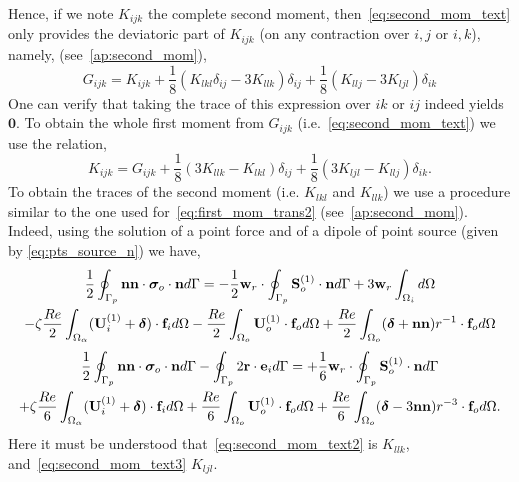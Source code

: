 Hence, if we note $K_{ijk}$ the complete second moment, then~\ref{eq:second_mom_text} only provides the deviatoric part of $K_{ijk}$ (on any contraction over $i,j$ or $i,k$), 
namely, (see~\ref{ap:second_mom}),   
\begin{equation}
    G_{ijk} = K_{ijk}
    +  \frac{1}{8} (K_{lkl}\delta_{ij}  - 3K_{llk})\delta_{ij}  
    + \frac{1}{8} (K_{llj} -3  K_{ljl})\delta_{ik} 
    \label{eq:def_G}
\end{equation}
One can verify that taking the trace of this expression over $ik$ or $ij$ indeed yields $\bm{0}$. 
To obtain the whole first moment from $G_{ijk}$ (i.e.~\ref{eq:second_mom_text}) we use the relation, 
\begin{equation}
    K_{ijk} = G_{ijk}  + \frac{1}{8}(3K_{llk}-K_{lkl}) \delta_{ij} + \frac{1}{8}(3K_{ljl} - K_{llj}) \delta_{ik}. 
    \label{eq:def_K}
\end{equation}
To obtain the traces of the second moment (i.e. $K_{lkl}$ and $K_{llk}$) we use a procedure similar to the one used for~\ref{eq:first_mom_trans2} (see~\ref{ap:second_mom}). 
Indeed, using the solution of a point force and of a dipole of point source (given by \eqref{eq:pts_source_n}) we have, 
 \begin{multline}
    \frac{1}{2}\intS[p]{\textbf{nn} \cdot  \bm\sigma_{o}\cdot \textbf{n}}
    =
    - \frac{1}{2}
    \textbf{w}_{r}\cdot  \intS[p]{\textbf{S}_{o}^{(1)}\cdot \textbf{n}}
    + 3\textbf{w}_r \intO[i]{}\\
    - \zeta \frac{Re}{2} \intO{(\textbf{U}_{i}^{(1)} + \bm\delta)\cdot \textbf{f}_{i}} 
    - \frac{Re}{2}\intO[o]{\textbf{U}_{o}^{(1)}\cdot \textbf{f}_{o}}
    + \frac{Re}{2}\intO[o]{(\bm\delta + \textbf{nn})r^{-1}\cdot \textbf{f}_{o}}
    \label{eq:second_mom_text2}
\end{multline}
\begin{multline}
    \frac{1}{2}\intS[p]{\textbf{nn} \cdot  \bm\sigma_{o}\cdot \textbf{n}}
    - \intS[p]{2 \textbf{r}\cdot \textbf{e}_i}
    =
    +\frac{1}{6}
    \textbf{w}_{r}\cdot  \intS[p]{\textbf{S}_{o}^{(1)}\cdot \textbf{n}}\\
    + \zeta \frac{Re}{6} \intO{(\textbf{U}_{i}^{(1)} + \bm\delta)\cdot \textbf{f}_{i}} 
    + \frac{Re}{6}\intO[o]{\textbf{U}_{o}^{(1)}\cdot \textbf{f}_{o}}
    + 
    \frac{Re}{6}\intO[o]{(\bm\delta - 3\textbf{nn})r^{-3}\cdot \textbf{f}_{o}}.
    \label{eq:second_mom_text3}
\end{multline}
Here it must be understood that~\ref{eq:second_mom_text2} is $K_{llk}$, and~\ref{eq:second_mom_text3} $K_{ljl}$. 


